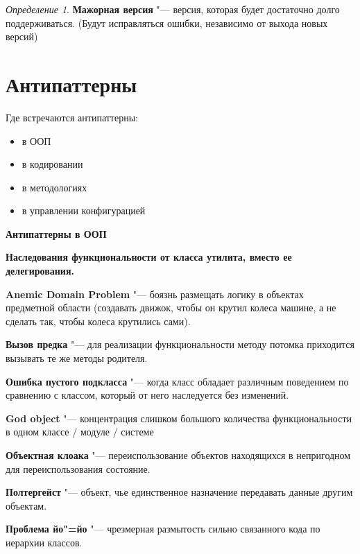 \documentclass[bachelor, och, pract]{SCWorks}
\theoremstyle{remark}
\newtheorem{definition}{Определение}
\begin{document}
    \begin{definition}
        \textbf{Мажорная версия} "--- версия, которая будет достаточно долго поддерживаться. (Будут исправляться ошибки, независимо от выхода новых версий)   
    \end{definition}



    \section{Антипаттерны}
    
    Где встречаются антипаттерны:

    \begin{itemize}[label=$\bullet$]
        \item в ООП 
        \item в кодировании
        \item в методологиях
        \item в управлении конфигурацией
    \end{itemize}

    \begin{center}
        \textbf{Антипаттерны в ООП}
    \end{center}

    \textbf{Наследования функциональности от класса утилита, вместо ее делегирования.}
    
    \textbf{Anemic Domain Problem} "--- боязнь размещать логику в объектах предметной области (создавать движок, чтобы он крутил колеса машине, а не сделать так, чтобы колеса крутились сами).
    
    \textbf{Вызов предка} "--- для реализации функциональности методу потомка приходится вызывать те же методы родителя.
    
    \textbf{Ошибка пустого подкласса} "--- когда класс обладает различным поведением по сравнению с классом, который от него наследуется без изменений.
    
    \textbf{God object} "--- концентрация слишком большого количества функциональности в одном классе / модуле / системе
    
    \textbf{Объектная клоака} "--- переиспользование объектов находящихся в непригодном для переиспользования состояние.
    
    \textbf{Полтергейст} "--- объект, чье единственное назначение передавать данные другим объектам.
    
    \textbf{Проблема йо"=йо} "--- чрезмерная размытость сильно связанного кода по иерархии классов.
    
\end{document}
